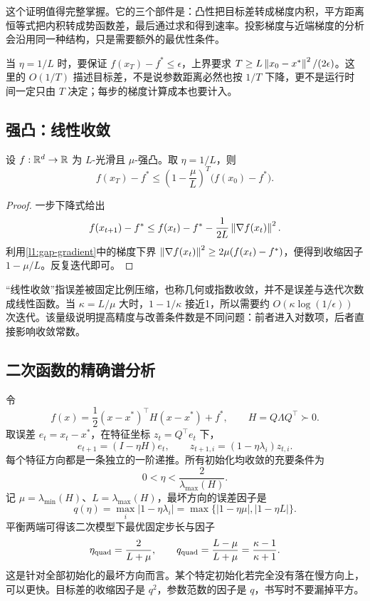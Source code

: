 这个证明值得完整掌握。它的三个部件是：凸性把目标差转成梯度内积，平方距离恒等式把内积转成势函数差，最后通过求和得到速率。投影梯度与近端梯度的分析会沿用同一种结构，只是需要额外的最优性条件。

当 $\eta=1/L$ 时，要保证 $f(x_T)-f^*\leq\epsilon$，上界要求 $T\geq L\left\lVert x_0-x^*\right\rVert^2/(2\epsilon)$。这里的 $O(1/T)$ 描述目标差，不是说参数距离必然也按 $1/T$ 下降，更不是运行时间一定只由 $T$ 决定；每步的梯度计算成本也要计入。

\subsection{强凸：线性收敛}

\begin{theorem}[光滑强凸梯度下降]
\label{l1:thm-gd-strong}
设 $f:\mathbb R^d\to\mathbb R$ 为 $L$-光滑且 $\mu$-强凸。取 $\eta=1/L$，则
\begin{equation}
 f(x_T)-f^*\leq
 \left(1-\frac\mu L\right)^T\bigl(f(x_0)-f^*\bigr).
 \label{l1:gd-strong-rate}
\end{equation}
\end{theorem}

\begin{proof}
一步下降式给出
\[
 f(x_{t+1})-f^*
 \leq f(x_t)-f^*-\frac1{2L}\left\lVert\nabla f(x_t)\right\rVert^2.
\]
利用\eqref{l1:gap-gradient}中的梯度下界
$\left\lVert\nabla f(x_t)\right\rVert^2\geq2\mu(f(x_t)-f^*)$，便得到收缩因子 $1-\mu/L$。反复迭代即可。
\end{proof}

“线性收敛”指误差被固定比例压缩，也称几何或指数收敛，并不是误差与迭代次数成线性函数。当 $\kappa=L/\mu$ 大时，$1-1/\kappa$ 接近1，所以需要约 $O(\kappa\log(1/\epsilon))$ 次迭代。该量级说明提高精度与改善条件数是不同问题：前者进入对数项，后者直接影响收敛常数。

\subsection{二次函数的精确谱分析}

令
\[
 f(x)=\frac12(x-x^*)^\top H(x-x^*)+f^*,
 \qquad H=Q\Lambda Q^\top\succ0.
\]
取误差 $e_t=x_t-x^*$，在特征坐标 $z_t=Q^\top e_t$ 下，
\begin{equation}
 e_{t+1}=(I-\eta H)e_t,
 \qquad z_{t+1,i}=(1-\eta\lambda_i)z_{t,i}.
 \label{l1:quad-mode}
\end{equation}
每个特征方向都是一条独立的一阶递推。所有初始化均收敛的充要条件为
\[
 0<\eta<\frac2{\lambda_{\max}(H)}.
\]
记 $\mu=\lambda_{\min}(H)$、$L=\lambda_{\max}(H)$，最坏方向的误差因子是
\[
 q(\eta)=\max_i|1-\eta\lambda_i|
        =\max\{|1-\eta\mu|,|1-\eta L|\}.
\]
平衡两端可得该二次模型下最优固定步长与因子
\begin{equation}
 \eta_{\rm quad}=\frac2{L+\mu},
 \qquad q_{\rm quad}=\frac{L-\mu}{L+\mu}
                    =\frac{\kappa-1}{\kappa+1}.
 \label{l1:quad-optimal-step}
\end{equation}
这是针对全部初始化的最坏方向而言。某个特定初始化若完全没有落在慢方向上，可以更快。目标差的收缩因子是 $q^2$，参数范数的因子是 $q$，书写时不要漏掉平方。

